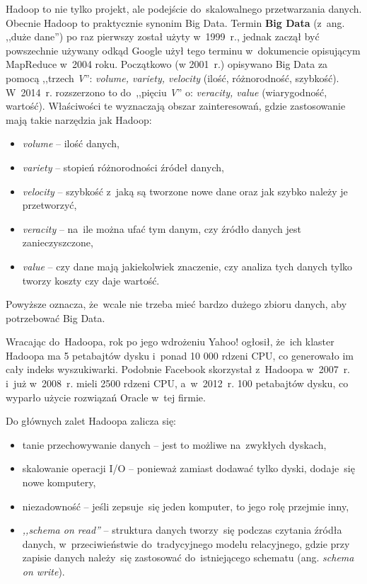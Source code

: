 \documentclass[12pt,a4paper,twoside,titlepage,openright]{book}
\begin{document}
Hadoop to nie tylko projekt, ale podejście do~skalowalnego przetwarzania danych. \cite{hadoop} Obecnie Hadoop to praktycznie synonim Big Data. \cite{bigData} Termin \textbf{Big Data} (z~ang. ,,duże dane'') po raz pierwszy został użyty w~1999~r., jednak zaczął być powszechnie używany odkąd Google użył tego terminu w~dokumencie opisującym MapReduce w~2004 roku. Początkowo (w 2001~r.) opisywano Big Data za pomocą ,,trzech \textit{V}'': \textit{volume, variety, velocity} (ilość, różnorodność, szybkość). W~2014~r. rozszerzono to do~,,pięciu \textit{V}'' o: \textit{veracity, value} (wiarygodność, wartość).\cite{realTimeProcessing} Właściwości te wyznaczają obszar zainteresowań, gdzie zastosowanie mają takie narzędzia jak Hadoop:
\begin{itemize}
\item \textit{volume} -- ilość danych,
\item \textit{variety} -- stopień różnorodności źródeł danych,
\item \textit{velocity} -- szybkość z~jaką są tworzone nowe dane oraz jak szybko należy je przetworzyć,
\item \textit{veracity} -- na~ile można ufać tym danym, czy źródło danych jest zanieczyszczone,
\item \textit{value} -- czy dane mają jakiekolwiek znaczenie, czy analiza tych danych tylko tworzy koszty czy daje wartość.
\end{itemize}
Powyższe oznacza, że~wcale nie trzeba mieć bardzo dużego zbioru danych, aby potrzebować Big Data. \cite{hadoop}

Wracając do~Hadoopa, rok po jego wdrożeniu Yahoo! ogłosił, że~ich klaster Hadoopa ma 5 petabajtów dysku i~ponad 10 000 rdzeni CPU, co generowało im cały indeks wyszukiwarki. Podobnie Facebook skorzystał z~Hadoopa w~2007~r. i~już w~2008~r. mieli 2500 rdzeni CPU, a~w~2012~r. 100 petabajtów dysku, co wyparło użycie rozwiązań Oracle w~tej firmie.

Do głównych zalet Hadoopa zalicza się:
\begin{itemize}
\item tanie przechowywanie danych -- jest to możliwe na~zwykłych dyskach,
\item skalowanie operacji I/O -- ponieważ zamiast dodawać tylko dyski, dodaje~się nowe komputery,
\item niezadowność -- jeśli zepsuje~się jeden komputer, to jego rolę przejmie inny,
\item \textit{,,schema on read''} -- struktura danych tworzy~się podczas czytania źródła danych, w~przeciwieństwie do~tradycyjnego modelu relacyjnego, gdzie przy zapisie danych należy~się zastosować do~istniejącego schematu (ang. \textit{schema on write}).
\end{itemize}
\end{document}
